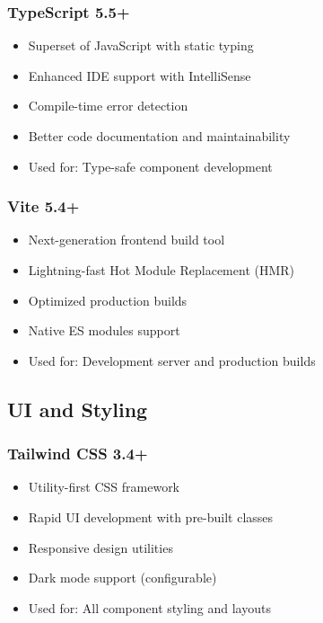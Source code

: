 \documentclass[12pt,a4paper]{report}
\begin{document}
\subsubsection{TypeScript 5.5+}
\begin{itemize}[leftmargin=*]
    \item Superset of JavaScript with static typing
    \item Enhanced IDE support with IntelliSense
    \item Compile-time error detection
    \item Better code documentation and maintainability
    \item Used for: Type-safe component development
\end{itemize}

\subsubsection{Vite 5.4+}
\begin{itemize}[leftmargin=*]
    \item Next-generation frontend build tool
    \item Lightning-fast Hot Module Replacement (HMR)
    \item Optimized production builds
    \item Native ES modules support
    \item Used for: Development server and production builds
\end{itemize}

\subsection{UI and Styling}

\subsubsection{Tailwind CSS 3.4+}
\begin{itemize}[leftmargin=*]
    \item Utility-first CSS framework
    \item Rapid UI development with pre-built classes
    \item Responsive design utilities
    \item Dark mode support (configurable)
    \item Used for: All component styling and layouts
\end{itemize}
\end{document}
